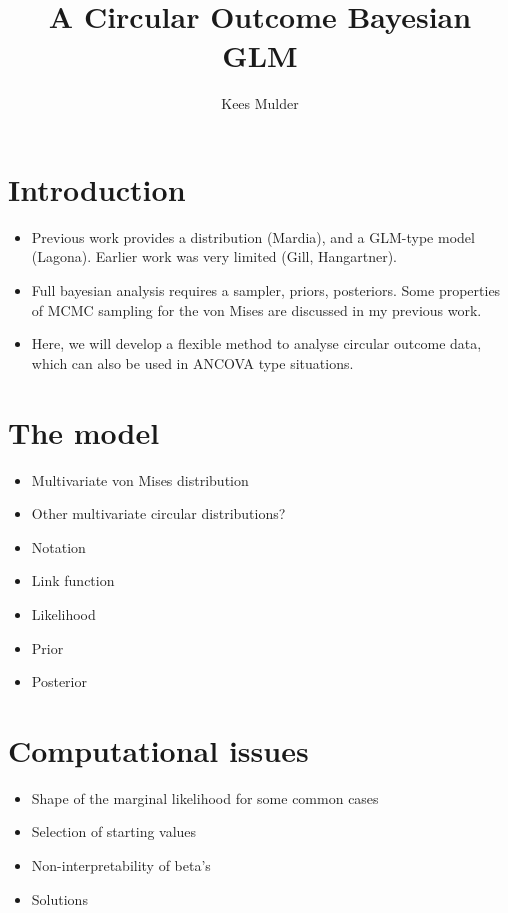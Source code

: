 \documentclass[12pt,a4paper]{article}
\author{Kees Mulder}
\title{A Circular Outcome Bayesian GLM}
\begin{document}
\maketitle

\section{Introduction}

\begin{itemize}
\item Previous work provides a distribution (Mardia), and a GLM-type model (Lagona). Earlier work was very limited (Gill, Hangartner).
\item Full bayesian analysis requires a sampler, priors, posteriors. Some properties of MCMC sampling for the von Mises are discussed in my previous work.
\item Here, we will develop a flexible method to analyse circular outcome data, which can also be used in ANCOVA type situations. 
\end{itemize}

\section{The model}

\begin{itemize}
\item Multivariate von Mises distribution
\item Other multivariate circular distributions?
\item Notation
\item Link function
\item Likelihood
\item Prior
\item Posterior
\end{itemize}

\section{Computational issues}

\begin{itemize}
\item Shape of the marginal likelihood for some common cases
\item Selection of starting values
\item Non-interpretability of beta's
\item Solutions
\end{itemize}
\end{document}
